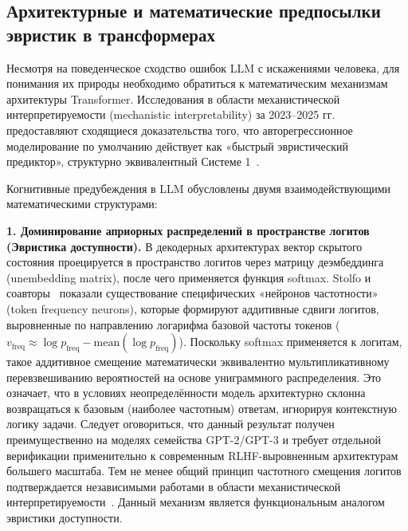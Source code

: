 \subsection{Архитектурные и математические предпосылки эвристик в трансформерах}

Несмотря на поведенческое сходство ошибок LLM с искажениями человека, для понимания их природы необходимо обратиться к математическим механизмам архитектуры Transformer. Исследования в области механистической интерпретируемости (mechanistic interpretability) за 2023--2025 гг. предоставляют сходящиеся доказательства того, что авторегрессионное моделирование по умолчанию действует как «быстрый эвристический предиктор», структурно эквивалентный Системе 1~\cite{zhang2025identifying}. 

Когнитивные предубеждения в LLM обусловлены двумя взаимодействующими математическими структурами:

\textbf{1. Доминирование априорных распределений в пространстве логитов (Эвристика доступности).} 
В декодерных архитектурах вектор скрытого состояния проецируется в пространство логитов через матрицу деэмбеддинга (unembedding matrix), после чего применяется функция softmax. Stolfo и соавторы~\cite{stolfo2024confidence} показали существование специфических «нейронов частотности» (token frequency neurons), которые формируют аддитивные сдвиги логитов, выровненные по направлению логарифма базовой частоты токенов ($v_{\text{freq}} \approx \log p_{\text{freq}} - \text{mean}(\log p_{\text{freq}})$). Поскольку softmax применяется к логитам, такое аддитивное смещение математически эквивалентно мультипликативному перевзвешиванию вероятностей на основе униграммного распределения. Это означает, что в условиях неопределённости модель архитектурно склонна возвращаться к базовым (наиболее частотным) ответам, игнорируя контекстную логику задачи. Следует оговориться, что данный результат получен преимущественно на моделях семейства GPT-2/GPT-3 и требует отдельной верификации применительно к современным RLHF-выровненным архитектурам большего масштаба. Тем не менее общий принцип частотного смещения логитов подтверждается независимыми работами в области механистической интерпретируемости~\cite{zhang2025identifying}. Данный механизм является функциональным аналогом эвристики доступности.

